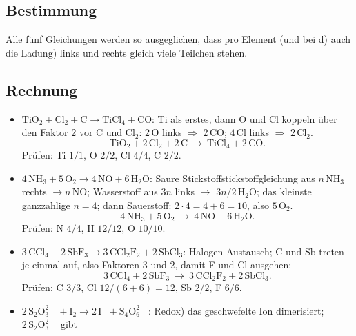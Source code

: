 
\subsection*{Bestimmung}
Alle fünf Gleichungen werden so ausgeglichen, dass pro Element (und bei d) auch
die Ladung) links und rechts gleich viele Teilchen stehen.

\subsection*{Rechnung}
\begin{itemize}
  \item[a)] $\mathrm{TiO_2} + \mathrm{Cl_2} + \mathrm{C}
        \rightarrow \mathrm{TiCl_4} + \mathrm{CO}$: \quad Ti als erstes, dann
        O und Cl koppeln über den Faktor $2$ vor $\mathrm{C}$ und $\mathrm{Cl_2}$:
        $2\,\mathrm{O}$ links $\Rightarrow$ $2\,\mathrm{CO}$; $4\,\mathrm{Cl}$
        links $\Rightarrow$ $2\,\mathrm{Cl_2}$.
        \[
          \mathrm{TiO_2} + 2\,\mathrm{Cl_2} + 2\,\mathrm{C}
          \ \rightarrow\ \mathrm{TiCl_4} + 2\,\mathrm{CO}.
        \]
        Prüfen: Ti $1/1$, O $2/2$, Cl $4/4$, C $2/2$.
  \item[b)] $4\,\mathrm{NH_3} + 5\,\mathrm{O_2}
        \rightarrow 4\,\mathrm{NO} + 6\,\mathrm{H_2O}$:
        Saure Stickstoffstickstoffgleichung aus $n\,\mathrm{NH_3}$ rechts
        $\rightarrow n\,\mathrm{NO}$; Wasserstoff aus $3n$ links $\rightarrow$
        $3n/2\,\mathrm{H_2O}$; das kleinste ganzzahlige $n=4$; dann Sauerstoff:
        $2\cdot 4 = 4 + 6 = 10$, also $5\,\mathrm{O_2}$.
        \[
          4\,\mathrm{NH_3} + 5\,\mathrm{O_2}
          \ \rightarrow\ 4\,\mathrm{NO} + 6\,\mathrm{H_2O}.
        \]
        Prüfen: N $4/4$, H $12/12$, O $10/10$.
  \item[c)] $3\,\mathrm{CCl_4} + 2\,\mathrm{SbF_3}
        \rightarrow 3\,\mathrm{CCl_2F_2} + 2\,\mathrm{SbCl_3}$:
        Halogen-Austausch; C und Sb treten je einmal auf, also Faktoren $3$ und
        $2$, damit F und Cl ausgehen:
        \[
          3\,\mathrm{CCl_4} + 2\,\mathrm{SbF_3}
          \ \rightarrow\ 3\,\mathrm{CCl_2F_2} + 2\,\mathrm{SbCl_3}.
        \]
        Prüfen: C $3/3$, Cl $12/(6+6)=12$, Sb $2/2$, F $6/6$.
  \item[d)] $2\,\mathrm{S_2O_3^{2-}} + \mathrm{I_2}
        \rightarrow 2\,\mathrm{I^-} + \mathrm{S_4O_6^{2-}}$:
        Redox) das geschwefelte Ion dimerisiert; $2\,\mathrm{S_2O_3^{2-}}$ gibt

\end{itemize}
